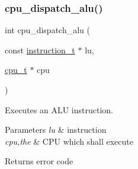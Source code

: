 \subsubsection{\texorpdfstring{cpu\+\_\+dispatch\+\_\+alu()}{cpu\_dispatch\_alu()}}
{\footnotesize\ttfamily int cpu\+\_\+dispatch\+\_\+alu (\begin{DoxyParamCaption}\item[{const \hyperlink{structinstruction__t}{instruction\+\_\+t} $\ast$}]{lu,  }\item[{\hyperlink{structcpu__t}{cpu\+\_\+t} $\ast$}]{cpu }\end{DoxyParamCaption})}



Executes an A\+LU instruction. 


\begin{DoxyParams}{Parameters}
{\em lu} & instruction \\
\hline
{\em cpu,the} & C\+PU which shall execute \\
\hline
\end{DoxyParams}
\begin{DoxyReturn}{Returns}
error code 
\end{DoxyReturn}
